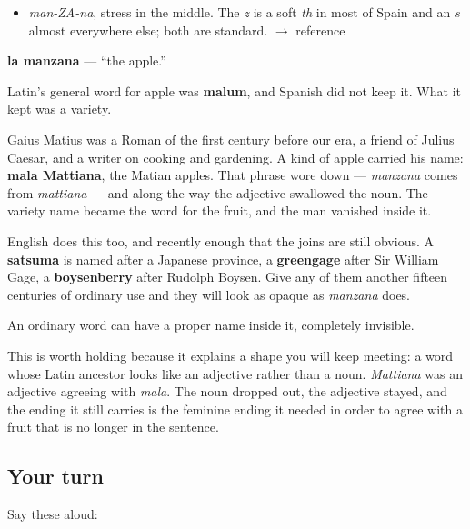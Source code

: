 \begin{sounds}
\begin{itemize}
\raggedright
  \item \emph{man-ZA-na}, stress in the middle. The \emph{z} is a soft \emph{th} in most of Spain and an \emph{s} almost everywhere else; both are standard. $\to$ reference
\end{itemize}
\end{sounds}

\begin{cousinweb}
\textbf{la manzana} — \textquotedblleft{}the apple.\textquotedblright{}

Latin's general word for apple was \textbf{malum}, and Spanish did not keep it. What it kept was a variety.

Gaius Matius was a Roman of the first century before our era, a friend of Julius Caesar, and a writer on cooking and gardening. A kind of apple carried his name: \textbf{mala Mattiana}, the Matian apples. That phrase wore down — \emph{manzana} comes from \emph{mattiana} — and along the way the adjective swallowed the noun. The variety name became the word for the fruit, and the man vanished inside it.

English does this too, and recently enough that the joins are still obvious. A \textbf{satsuma} is named after a Japanese province, a \textbf{greengage} after Sir William Gage, a \textbf{boysenberry} after Rudolph Boysen. Give any of them another fifteen centuries of ordinary use and they will look as opaque as \emph{manzana} does.
\end{cousinweb}

\begin{grammarlens}[title={What you've built}]
An ordinary word can have a proper name inside it, completely invisible.

This is worth holding because it explains a shape you will keep meeting: a word whose Latin ancestor looks like an adjective rather than a noun. \emph{Mattiana} was an adjective agreeing with \emph{mala}. The noun dropped out, the adjective stayed, and the ending it still carries is the feminine ending it needed in order to agree with a fruit that is no longer in the sentence.
\end{grammarlens}

\subsection*{Your turn}
Say these aloud:

